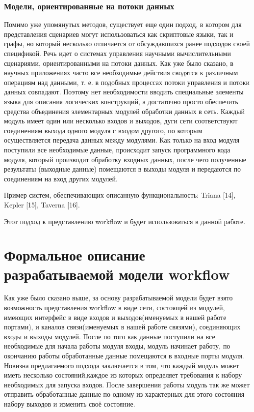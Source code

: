 \documentclass[koi8-r,usehyperref,12pt]{G7-32}
\begin{document}
\subsubsection{Модели, ориентированные на потоки данных}
Помимо уже упомянутых методов, существует еще один подход, в котором для представления сценариев могут использоваться как скриптовые
языки, так и графы, но который несколько отличается от обсуждавшихся
ранее подходов своей спецификой.
Речь идет о системах управления научными вычислительными сценариями, ориентированными на потоки данных. Как уже было сказано,
в научных приложениях часто все необходимые действия сводятся к различным операциям над данными, т. е. в подобных процессах потоки
управления и потоки данных совпадают. Поэтому нет необходимости вводить специальные элементы языка для описания логических конструкций, а достаточно просто обеспечить средства объединения элементарных модулей обработки данных в сеть. Каждый модуль имеет один или несколько входов и выходов, дуги сети соответствуют соединениям выхода одного
модуля с входом другого, по которым осуществляется передача данных
между модулями. Как только на вход модуля поступили все необходимые данные, происходит запуск программного кода модуля, который производит обработку входных данных, после чего полученные результаты (выходные данные) помещаются в выходы модуля и передаются по соединениям на вход других модулей. 


Пример систем, обеспечивающих описанную функциональность: Triana [14], Kepler [15], Taverna [16].

Этот подход к представлению workflow и будет использоваться в данной работе.

\section{Формальное описание разрабатываемой модели workflow}
Как уже было сказано выше, за основу разрабатываемой модели будет взято возможность представления workflow в виде сети, состоящей из модулей, имеющих интерфейс в виде входов и выходов(именуемых в нашей работе портами), и каналов связи(именуемых в нашей работе связями), соединяющих входы и выходы модулей. После по того как данные поступили на все необходимые для начала работы модуля входы, модуль начинает работу, по окончанию работы обработанные данные помещаются в входные порты модуля.\\

Новизна предлагаемого подхода заключается в том, что каждый модуль может иметь несколько состояний,каждое из которых определяет требования к набору необходимых для запуска входов. После завершения работы модуль так же может отправить обработанные данные по одному из характерных для этого состояния набору выходов и изменить своё состояние.\\
\end{document}
